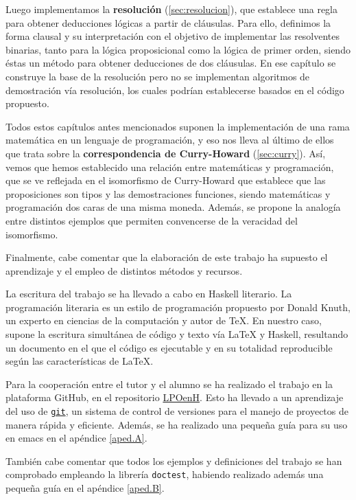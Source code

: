 Luego implementamos la \textbf{resolución} (\ref{sec:resolucion}), que
establece una regla para obtener deducciones lógicas a partir de
cláusulas. Para ello, definimos la forma clausal y su interpretación con el
objetivo de implementar las resolventes binarias, tanto para la lógica
proposicional como la lógica de primer orden, siendo éstas un método para
obtener deducciones de dos cláusulas. En ese capítulo se construye la base de
la resolución pero no se implementan algoritmos de demostración vía resolución,
los cuales podrían establecerse basados en el código propuesto.
  
Todos estos capítulos antes mencionados suponen la implementación de una rama
matemática en un lenguaje de programación, y eso nos lleva al último de ellos
que trata sobre la \textbf{correspondencia de Curry-Howard}
(\ref{sec:curry}). Así, vemos que hemos establecido una relación entre
matemáticas y programación, que se ve reflejada en el isomorfismo de
Curry-Howard que establece que las proposiciones son tipos y las demostraciones
funciones, siendo matemáticas y programación dos caras de una misma
moneda. Además, se propone la analogía entre distintos ejemplos que permiten
convencerse de la veracidad del isomorfismo.

\vspace{3mm}

Finalmente, cabe comentar que la elaboración de este trabajo ha supuesto el
aprendizaje y el empleo de distintos métodos y recursos.

La escritura del trabajo se ha llevado a cabo en Haskell literario. La
programación literaria es un estilo de programación propuesto por Donald Knuth,
un experto en ciencias de la computación y autor de TeX. En nuestro caso,
supone la escritura simultánea de código y texto vía LaTeX y Haskell,
resultando un documento en el que el código es ejecutable y en su totalidad
reproducible según las características de LaTeX.

Para la cooperación entre el tutor y el alumno se ha realizado el trabajo en la
plataforma GitHub, en el repositorio
\href{https://github.com/EduPH/LPOenH}{LPOenH}. Esto ha llevado a un
aprendizaje del uso de \href{https://git-scm.com/}{\texttt{git}}, un sistema de
control de versiones para el manejo de proyectos de manera rápida y
eficiente. Además, se ha realizado una pequeña guía para su uso en emacs en el
apéndice \ref{aped.A}.

También cabe comentar que todos los ejemplos y definiciones del trabajo se han
comprobado empleando la librería \texttt{doctest}, habiendo realizado además
una pequeña guía en el apéndice \ref{aped.B}.


